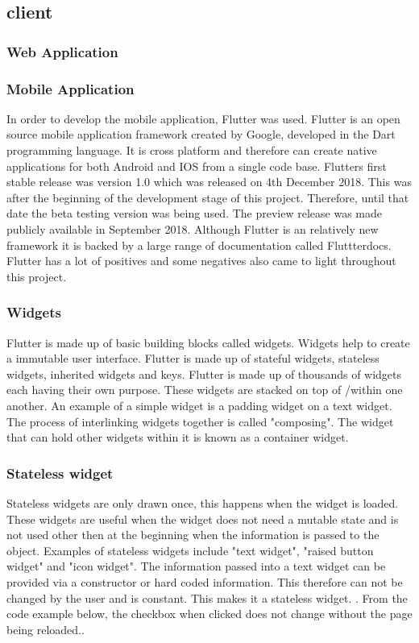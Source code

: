 \subsection{client}
\subsubsection{Web Application}

\subsubsection{Mobile Application}
In order to develop the mobile application, Flutter was used. Flutter is an open source mobile application framework created by Google, developed in the Dart programming language. It is cross platform and therefore can create native applications for both Android and IOS from a single code base. Flutters first stable release was version 1.0 which was released on 4th December 2018. This was after the beginning of the development stage of this project. Therefore, until that date the beta testing version was being used. The preview release was made publicly available in September 2018. Although Flutter is an relatively new framework it is backed by a large range of documentation called Fluttterdocs. Flutter has a lot of positives and some negatives also came to light throughout this project.

\subsubsection{Widgets}
Flutter is made up of basic building blocks called widgets. Widgets help to create a immutable user interface. Flutter is made up of stateful widgets, stateless widgets, inherited widgets and keys. Flutter is made up of thousands of widgets each having their own purpose. These widgets are stacked on top of /within one another. An example of a simple widget is a padding widget on a text widget. The process of interlinking widgets together is called "composing". The widget that can hold other widgets within it is known as a container widget.\cite{widgets}

\subsubsection{Stateless widget}
Stateless widgets are only drawn once, this happens when the widget is loaded. These widgets are useful when the widget does not need a mutable state and is not used other then at the beginning when the information is passed to the object. Examples of stateless widgets include "text widget", "raised button widget" and "icon widget". The information passed into a text widget can be provided via a constructor or hard coded information. This therefore can not be changed by the user and is constant. This makes it a stateless widget. \cite{birch_2019}. From the code example below, the checkbox when clicked does not change without the page being reloaded.\cite{stateful_widgets_2018}.

